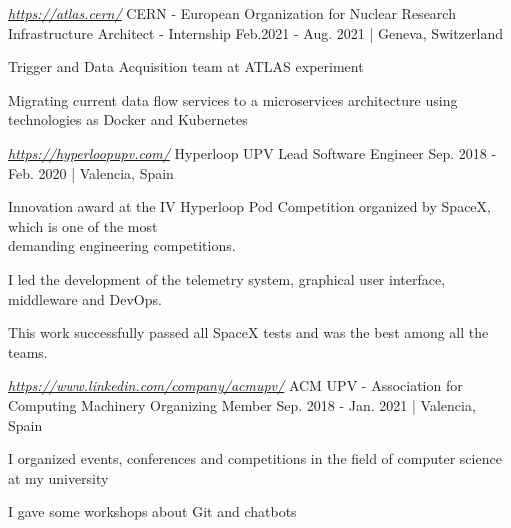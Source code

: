 

\begin{cventries}

  \cventry
    {\href{https://atlas.cern/}{\textit{https://atlas.cern/}}} %
    {CERN - European Organization for Nuclear Research} %
    {Infrastructure Architect - Internship} %
    {Feb.2021 - Aug. 2021 | Geneva,  Switzerland} %
    {
      \begin{cvitems} %
        \item {Trigger and Data Acquisition team at ATLAS experiment}
        \item {Migrating current data flow services to a microservices architecture using technologies as Docker and Kubernetes}
      \end{cvitems}
    }

  \cventry
    {\href{https://hyperloopupv.com/}{\textit{https://hyperloopupv.com/}}} %
    {Hyperloop UPV} %
    {Lead Software Engineer} %
    {Sep. 2018 - Feb. 2020 | Valencia, Spain} %
    {
      \begin{cvitems} %
        \item {Innovation award at the IV Hyperloop Pod Competition organized by SpaceX, which is one of the most \\demanding engineering competitions.}
        \item {I led the development of the telemetry system, graphical user interface, middleware and DevOps.}
        \item {This work successfully passed all SpaceX tests and was the best among all the teams.}
      \end{cvitems}
    }
    
  \cventry
    {\href{https://www.linkedin.com/company/acmupv/}{\textit{https://www.linkedin.com/company/acmupv/}}} %
    {ACM UPV - Association for Computing Machinery} %
    {Organizing Member} %
    {Sep. 2018 - Jan. 2021 | Valencia, Spain} %
    {
      \begin{cvitems} %
        \item {I organized events, conferences and competitions in the field of computer science at my university}
        \item {I gave some workshops about Git and chatbots}
      \end{cvitems}
    }

\end{cventries}
